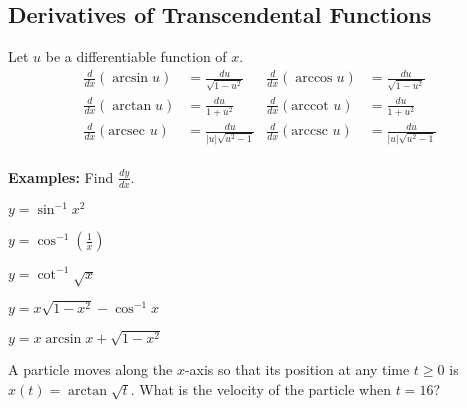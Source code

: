 \documentclass[addpoints, 12pt]{exam}
\begin{document}
\subsection*{Derivatives of Transcendental Functions}
\begin{tcolorbox}[title= DERIVATIVES OF INVERSE TRIGONOMETRIC FUNCTIONS,colframe=black,sharp corners, colback=white, colbacktitle=white, coltitle=black, boxrule=1pt]
    
    Let $u$ be a differentiable function of $x$.
    \begin{align*}
        \frac{d}{dx}(\arcsin u) &= \frac{du}{\sqrt{1-u^2}} & \frac{d}{dx}(\arccos u) &= \frac{du}{\sqrt{1-u^2}}\\
        \frac{d}{dx}(\arctan u) &= \frac{du}{1+u^2} & \frac{d}{dx}(\text{arccot } u) &= \frac{du}{1+u^2}\\
        \frac{d}{dx}(\text{arcsec } u) &= \frac{du}{|u|\sqrt{u^2-1}} & \frac{d}{dx}(\text{arccsc } u) &= \frac{du}{|u|\sqrt{u^2-1}}\\
    \end{align*}
\end{tcolorbox}
\vspace{.15cm}
\noindent\textbf{Examples:} Find $\displaystyle\frac{dy}{dx}$.
\begin{questions}
    \question $\displaystyle y=\sin^{-1}x^2$
    
    \question $\displaystyle y=\cos^{-1}\left(\frac{1}{x}\right)$
    
    \question $\displaystyle y=\cot^{-1}\sqrt{x}$
    
    \question $\displaystyle y=x\sqrt{1-x^2}-\cos^{-1}x$
    
    \newpage
    
    \question $\displaystyle y=x\arcsin x+\sqrt{1-x^2}$
    
    \question A particle moves along the $x$-axis so that its position at any time $t\ge0$ is $x(t)=\arctan\sqrt{t}$. What is the velocity of the particle when $t=16$?
\end{questions}
\end{document}
